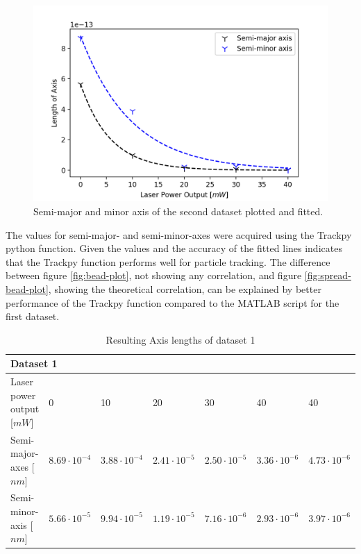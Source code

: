 \begin{minipage}{\linewidth}
\begin{minipage}[r]{0.45\linewidth}
\begin{figure}[H]
            \includegraphics[width=\linewidth]{figures/axis-dataset1.png}
            \caption{Semi-major and minor axis of the second dataset plotted and fitted.\\}
            \label{fig:spread-trap-plot}
        \end{figure}
    \end{minipage}

\end{minipage}

The values for semi-major- and semi-minor-axes were acquired using the Trackpy python function. Given the values and the accuracy of the fitted lines indicates that the Trackpy function performs well for particle tracking. The difference between figure \ref{fig:bead-plot}, not showing any correlation, and figure \ref{fig:spread-bead-plot}, showing the theoretical correlation, can be explained by better performance of the Trackpy function compared to the MATLAB script for the first dataset.

\begin{table}[]
\caption{Resulting Axis lengths of dataset 1}
\label{tab:axis-results-one}
\begin{tabular}{|l|l|l|l|l|l|l|}
\hline
\multicolumn{7}{|l|}{Dataset 1}                                                                                         \\ \hline
Laser power output [$mW$] & 0                                                    & 10   & 20   & 30   & 40   & 40   \\ \hline
Semi-major-axes [$nm$]   & $8.69 \cdot 10^{-4}$ & $3.88\cdot 10^{-4}$ & $2.41\cdot 10^{-5}$ & $2.50\cdot 10^{-5}$ & $3.36\cdot 10^{-6}$ & $4.73\cdot 10^{-6}$ \\ \hline
Semi-minor-axis [$nm$]   & $5.66 \cdot 10^{-5}$ & $9.94\cdot 10^{-5}$ & $1.19\cdot 10^{-5}$ & $7.16\cdot 10^{-6}$ & $2.93\cdot 10^{-6}$ & $3.97\cdot 10^{-6}$ \\ \hline
\end{tabular}
\end{table}


